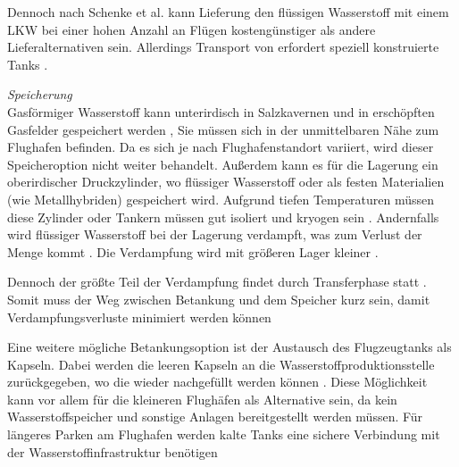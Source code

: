 Dennoch nach Schenke et al. \cite{schenke2024lh2} kann Lieferung den flüssigen Wasserstoff mit einem LKW bei einer hohen Anzahl an Flügen 
kostengünstiger als andere Lieferalternativen sein. Allerdings Transport von  erfordert speziell konstruierte Tanks \cite{mulder2019outlook}.

%

\textit{Speicherung}\\
Gasförmiger Wasserstoff kann unterirdisch in Salzkavernen und in erschöpften Gasfelder gespeichert werden \cite{undertaking2022strategic}, 
Sie müssen sich in der unmittelbaren Nähe zum Flughafen befinden. Da es sich je nach Flughafenstandort variiert, wird dieser Speicheroption nicht weiter behandelt.
Außerdem kann es für die Lagerung ein oberirdischer Druckzylinder, wo flüssiger Wasserstoff oder als festen Materialien (wie Metallhybriden) gespeichert wird.
Aufgrund tiefen Temperaturen müssen diese Zylinder oder Tankern müssen gut isoliert und kryogen sein \cite{undertaking2022strategic}.
Andernfalls wird flüssiger Wasserstoff bei der Lagerung verdampft, was zum Verlust der Menge kommt \cite{undertaking2022strategic}. 
Die Verdampfung wird mit größeren Lager kleiner \cite{colpan2022fuel}.

Dennoch der größte Teil der Verdampfung findet durch Transferphase statt \cite{undertaking2022strategic}.
Somit muss der Weg zwischen Betankung und dem Speicher kurz sein, damit Verdampfungsverluste minimiert werden können \cite{colpan2022fuel}


Eine weitere mögliche Betankungsoption ist der Austausch des Flugzeugtanks als Kapseln. Dabei werden die leeren Kapseln an die 
Wasserstoffproduktionsstelle zurückgegeben, wo die wieder nachgefüllt werden können \cite{colpan2022fuel}. 
Diese Möglichkeit kann vor allem für die kleineren Flughäfen als Alternative sein, da kein Wasserstoffspeicher und 
sonstige Anlagen bereitgestellt werden müssen.
Für längeres Parken am Flughafen werden kalte Tanks eine sichere Verbindung mit der Wasserstoffinfrastruktur benötigen \cite{colpan2022fuel} %



